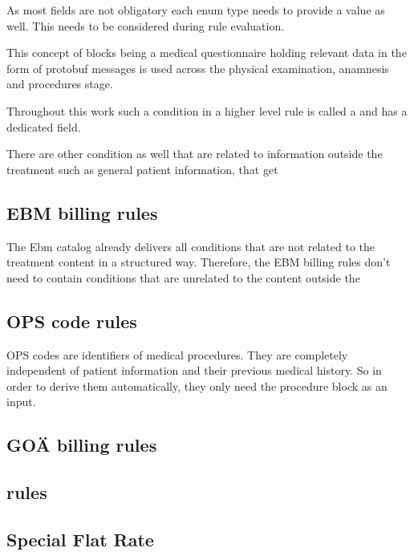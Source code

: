 As most fields are not obligatory each enum type needs to provide a  value as well.
This needs to be considered during rule evaluation.

This concept of blocks being a medical questionnaire holding relevant data in the form of protobuf messages is used across the physical examination, anamnesis and procedures stage.

Throughout this work such a condition in a higher level rule is called a  and has a dedicated field.


There are other condition as well that are related to information outside the treatment such as general patient information, that get


\subsection{EBM billing rules}
The Ebm catalog already delivers all conditions that are not related to the treatment content in a structured way.
Therefore, the EBM billing rules don't need to contain conditions that are unrelated to the content outside the

\subsection{OPS code rules}
OPS codes are identifiers of medical procedures.
They are completely independent of patient information and their previous medical history.
So in order to derive them automatically, they only need the procedure block as an input.

\subsection{GOÄ billing rules}





\subsection{\MJ rules}




\subsection{Special Flat Rate}


